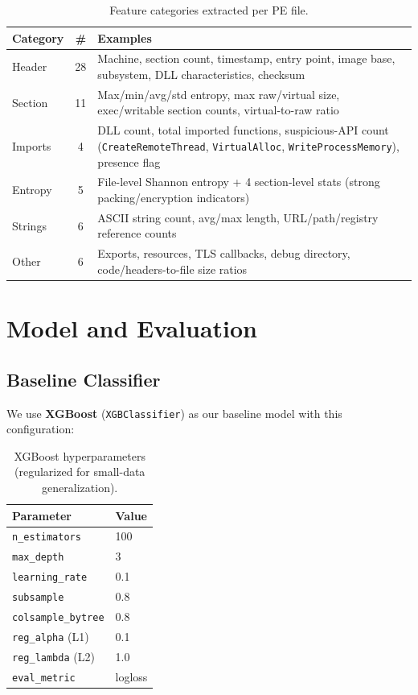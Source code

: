 \documentclass[12pt,a4paper]{article}
\begin{document}
\begin{table}[H]
\centering
\caption{Feature categories extracted per PE file.}
\label{tab:features}
\begin{tabular}{lcp{8.5cm}}
\toprule
\textbf{Category} & \textbf{\#} & \textbf{Examples} \\
\midrule
Header & 28 & Machine, section count, timestamp, entry point, image base, subsystem, DLL characteristics, checksum \\
Section & 11 & Max/min/avg/std entropy, max raw/virtual size, exec/writable section counts, virtual-to-raw ratio \\
Imports & 4 & DLL count, total imported functions, suspicious-API count (\texttt{CreateRemoteThread}, \texttt{VirtualAlloc}, \texttt{WriteProcessMemory}), presence flag \\
Entropy & 5 & File-level Shannon entropy + 4 section-level stats (strong packing/encryption indicators) \\
Strings & 6 & ASCII string count, avg/max length, URL/path/registry reference counts \\
Other & 6 & Exports, resources, TLS callbacks, debug directory, code/headers-to-file size ratios \\
\bottomrule
\end{tabular}
\end{table}

\section{Model and Evaluation}
\label{sec:model}

\subsection{Baseline Classifier}

We use \textbf{XGBoost} (\texttt{XGBClassifier}) as our baseline model with this configuration:

\begin{table}[H]
\centering
\caption{XGBoost hyperparameters (regularized for small-data generalization).}
\begin{tabular}{ll}
\toprule
\textbf{Parameter} & \textbf{Value} \\
\midrule
\texttt{n\_estimators} & 100 \\
\texttt{max\_depth} & 3 \\
\texttt{learning\_rate} & 0.1 \\
\texttt{subsample} & 0.8 \\
\texttt{colsample\_bytree} & 0.8 \\
\texttt{reg\_alpha} (L1) & 0.1 \\
\texttt{reg\_lambda} (L2) & 1.0 \\
\texttt{eval\_metric} & logloss \\
\bottomrule
\end{tabular}
\end{table}
\end{document}
